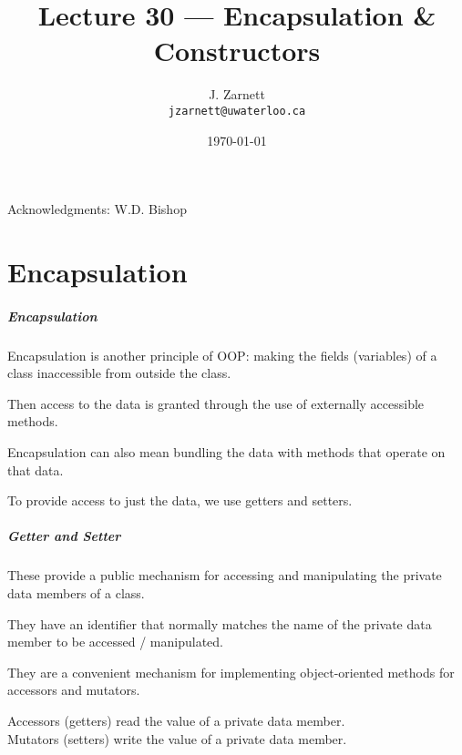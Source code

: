 

\title{Lecture 30 --- Encapsulation \& Constructors}

\author{J. Zarnett\\
\texttt{jzarnett@uwaterloo.ca}}
\date{\today}



\begin{frame}
  \titlepage
  
  \begin{center}
  \small{Acknowledgments: W.D. Bishop}
  \end{center}
\end{frame}

\part{Encapsulation}
\begin{frame}\partpage\end{frame}

\begin{frame}
\frametitle{Encapsulation}
\alert{Encapsulation} is another principle of OOP: making the fields (variables) of a class inaccessible from outside the class.

Then access to the data is granted through the use of externally accessible methods.

Encapsulation can also mean bundling the data with methods that operate on that data.

To provide access to just the data, we use \alert{getter}s and \alert{setter}s.

\end{frame}


\begin{frame}
\frametitle{Getter and Setter}

These provide a public mechanism for accessing and manipulating the private data members of a class.

They have an identifier that normally matches the name of the private data member to be accessed / manipulated.

They are a convenient mechanism for implementing object-oriented methods for accessors and mutators.

\alert{Accessors} (getters) read the value of a private data member.\\
\alert{Mutators} (setters) write the value of a private data member.

\end{frame}

